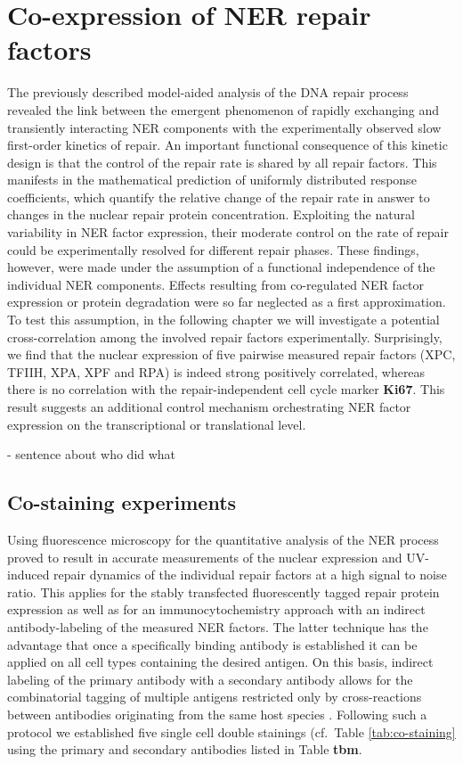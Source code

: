 \chapter{Co-expression of NER repair factors}
The previously described model-aided analysis of the DNA repair process revealed the link between the emergent phenomenon of rapidly exchanging and transiently interacting NER components with the experimentally observed slow first-order kinetics of repair. An important functional consequence of this kinetic design is that the control of the repair rate is shared by all repair factors. This manifests in the mathematical prediction of uniformly distributed response coefficients, which quantify the relative change of the repair rate in answer to changes in the nuclear repair protein concentration. Exploiting the natural variability in NER factor expression, their moderate control on the rate of repair could be experimentally resolved for different repair phases. These findings, however, were made under the assumption of a functional independence of the individual NER components. Effects resulting from co-regulated NER factor expression or protein degradation were so far neglected as a first approximation.  \\
To test this assumption, in the following chapter we will investigate a potential cross-correlation among the involved repair factors experimentally. Surprisingly, we find that the nuclear expression of five pairwise measured repair factors (XPC, TFIIH, XPA, XPF and RPA) is indeed strong positively correlated, whereas there is no correlation with the repair-independent cell cycle marker \textbf{Ki67}. This result suggests an additional control mechanism orchestrating NER factor expression on the transcriptional or translational level.    

- sentence about who did what

\section{Co-staining experiments}

Using fluorescence microscopy for the quantitative analysis of the NER process proved to result in accurate measurements of the nuclear expression and UV-induced repair dynamics of the individual repair factors at a high signal to noise ratio. This applies for the stably transfected fluorescently tagged repair protein expression as well as for an immunocytochemistry approach with an indirect antibody-labeling of the measured NER factors. The latter technique has the advantage that once a specifically binding antibody is established it can be applied on all cell types containing the desired antigen. On this basis, indirect labeling of the primary antibody with a secondary antibody allows for the combinatorial tagging of multiple antigens restricted only by cross-reactions between antibodies originating from the same host species \cite{Burry2011,Giepmans2006}. Following such a protocol we established five single cell double stainings (cf.\ Table \ref{tab:co-staining} using the primary and secondary antibodies listed in Table \textbf{tbm}. 


